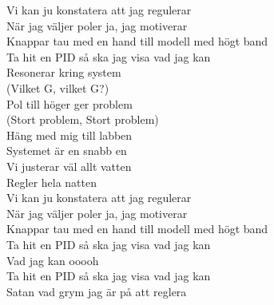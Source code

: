 \documentclass[a6paper, 10pt, twoside]{article}
\begin{document}
\begin{lyrics}
Vi kan ju konstatera att jag regulerar\\
När jag väljer poler ja, jag motiverar\\
Knappar tau med en hand till modell med högt band\\
Ta hit en PID så ska jag visa vad jag kan
\vspace{5pt}\\
Resonerar kring system\\
(Vilket G, vilket G?)\\
Pol till höger ger problem\\
(Stort problem, Stort problem)
\vspace{5pt}\\
Häng med mig till labben\\
Systemet är en snabb en\\
Vi justerar väl allt vatten\\
Regler hela natten
\vspace{5pt}\\
Vi kan ju konstatera att jag regulerar\\
När jag väljer poler ja, jag motiverar\\
Knappar tau med en hand till modell med högt band\\
Ta hit en PID så ska jag visa vad jag kan
\vspace{5pt}\\
Vad jag kan ooooh\\
Ta hit en PID så ska jag visa vad jag kan\\
Satan vad grym jag är på att reglera
\end{lyrics}
\end{document}
